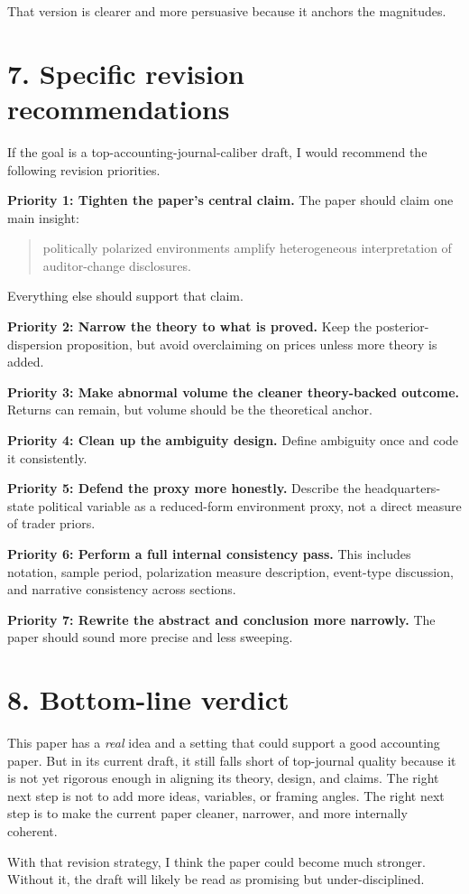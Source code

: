 That version is clearer and more persuasive because it anchors the magnitudes.

\section*{7. Specific revision recommendations}

If the goal is a top-accounting-journal-caliber draft, I would recommend the following revision priorities.

\textbf{Priority 1: Tighten the paper's central claim.}
The paper should claim one main insight:
\begin{quote}
politically polarized environments amplify heterogeneous interpretation of auditor-change disclosures.
\end{quote}
Everything else should support that claim.

\textbf{Priority 2: Narrow the theory to what is proved.}
Keep the posterior-dispersion proposition, but avoid overclaiming on prices unless more theory is added.

\textbf{Priority 3: Make abnormal volume the cleaner theory-backed outcome.}
Returns can remain, but volume should be the theoretical anchor.

\textbf{Priority 4: Clean up the ambiguity design.}
Define ambiguity once and code it consistently.

\textbf{Priority 5: Defend the proxy more honestly.}
Describe the headquarters-state political variable as a reduced-form environment proxy, not a direct measure of trader priors.

\textbf{Priority 6: Perform a full internal consistency pass.}
This includes notation, sample period, polarization measure description, event-type discussion, and narrative consistency across sections.

\textbf{Priority 7: Rewrite the abstract and conclusion more narrowly.}
The paper should sound more precise and less sweeping.

\section*{8. Bottom-line verdict}

This paper has a \emph{real} idea and a setting that could support a good accounting paper. But in its current draft, it still falls short of top-journal quality because it is not yet rigorous enough in aligning its theory, design, and claims. The right next step is not to add more ideas, variables, or framing angles. The right next step is to make the current paper cleaner, narrower, and more internally coherent.

With that revision strategy, I think the paper could become much stronger. Without it, the draft will likely be read as promising but under-disciplined.


